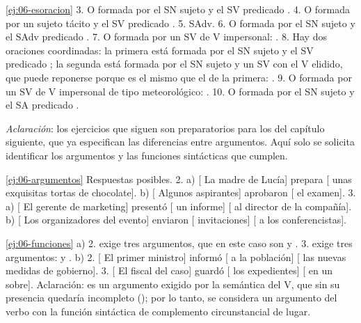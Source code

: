 \begin{solucion}{\ref{ej:06-esoracion}}
3. O formada por el SN sujeto  y el SV predicado
. 4. O formada por un sujeto tácito y el SV
predicado . 5. SAdv. 6. O formada por el SN sujeto
 y el SAdv predicado
. 7. O formada por un SV de V impersonal: . 8. Hay dos oraciones coordinadas: la primera
está formada por el SN sujeto  y el SV predicado
; la segunda está formada por el SN sujeto  y un SV con el V elidido, que puede reponerse porque es el mismo
que el de la primera: . 9. O formada por un SV de V
impersonal de tipo meteorológico: . 10. O formada por el SN sujeto  y el SA predicado .

\textit{Aclaración}: los ejercicios que siguen son preparatorios para los del
capítulo siguiente, que ya especifican las diferencias entre argumentos. Aquí
solo se solicita identificar los argumentos y las funciones sintácticas que
cumplen.
\end{solucion}

\begin{solucion}{\ref{ej:06-argumentos}}
Respuestas posibles. 2. a) [ La madre de Lucía] prepara [
unas exquisitas tortas de chocolate]. b) [ Algunos aspirantes]
aprobaron [ el examen]. 3. a) [ El gerente de marketing]
presentó [ un informe] [ al director de la compañía]. b)
[ Los organizadores del evento] enviaron [ invitaciones]
[ a los conferencistas].
\end{solucion}

\begin{solucion}{\ref{ej:06-funciones}}
a) 2.  exige tres argumentos, que en este caso son  y . 3.
 exige tres argumentos:  y . b) 2. [ El primer ministro] informó
[ a la población] [ las nuevas medidas de gobierno]. 3.
[ El fiscal del caso] guardó [ los expedientes] [ en
un sobre]. Aclaración:  es un argumento exigido por la
semántica del V, que sin su presencia quedaría incompleto
(); por lo tanto,
se considera un argumento del verbo con la función sintáctica de complemento
circunstancial de lugar.
\end{solucion}


